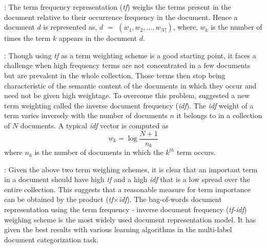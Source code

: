  : The term frequency representation (\emph{tf}) weighs the terms present in the document relative to their occurrence frequency in the document. Hence a document $d$ is represented as, $d$ $=$ $(w_{1}, w_{2}, \ldots, w_{|V|})$, where, $w_{k}$ is the number of times the term $k$ appears in the document $d$. 

 : Though using \emph{tf} as a term weighting scheme is a good starting point, it faces a challenge when high frequency terms are not concentrated in a few documents but are prevalent in the whole collection. Those terms then stop being characteristic of the semantic content of the documents in which they occur and need not be given high weightage. To overcome this problem, \citet{salton1988term} suggested a new term weighting called the inverse
document frequency (\emph{idf}). The \emph{idf} weight of a term varies inversely with the number of documents $n$ it belongs to in a collection of  $N$ documents. A typical \emph{idf} vector is computed as 
\begin{equation}
w_{k} = \log \frac{N+1}{n_k}
\end{equation}
where $n_k$ is the number of documents in which the $k^{th}$ term occurs.

 : Given the above two term weighing schemes, it is clear that an important term in a document should have high \emph{tf} and a high {\em idf} that is a low spread over the entire collection. This suggests that a reasonable measure for term importance can be obtained by the product (\emph{tf}$\times$\emph{idf}). The bag-of-words document representation using the term frequency - inverse document frequency (\emph{tf-idf})
weighing scheme is the most widely used document representation model. It has given the best results with various learning algorithms in the multi-label document categorization task.


